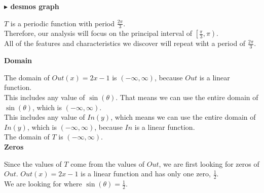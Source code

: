 \documentclass{ximera}
\begin{document}
\textbf{\textcolor{blue!55!black}{$\blacktriangleright$ desmos graph}} 
\begin{center}
\end{center}





\begin{observation}

$T$ is a periodic function with period $\frac{2\pi}{3}$. \\


Therefore, our analysis will focus on the principal interval of $\left[ \frac{\pi}{3}, \pi \right)$. \\


All of the features and characteristics we discover will repeat wiht a period of $\frac{2\pi}{3}$.\\


\end{observation}









\textbf{\textcolor{blue!55!black}{Domain}}


The domain of $Out(x) = 2x - 1$ is $(-\infty, \infty)$, because $Out$ is a linear function.  \\

This includes any value of $\sin(\theta)$. That means we can use the entire domain of $\sin(\theta)$, which is $(-\infty, \infty)$.  \\


This includes any value of $In(y)$, which means we can use the entire domain of $In(y)$, which is $(-\infty, \infty)$, because $In$ is a linear function.  \\


The domain of $T$ is $(-\infty, \infty)$. \\








\textbf{\textcolor{blue!55!black}{Zeros}}


Since the values of $T$ come from the values of $Out$, we are first looking for zeros of $Out$.  $Out(x) = 2x - 1$ is a linear function and has only one zero, $\frac{1}{2}$. \\

We are looking for where $\sin(\theta) = \frac{1}{2}$. \\
\end{document}

